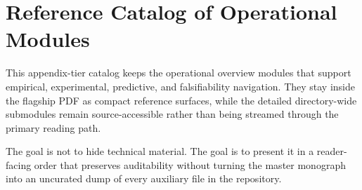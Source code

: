 \section{Reference Catalog of Operational Modules}
\label{sec:oc-core-1-3-reference-catalog}

This appendix-tier catalog keeps the operational overview modules that support
empirical, experimental, predictive, and falsifiability navigation. They stay
inside the flagship PDF as compact reference surfaces, while the detailed
directory-wide submodules remain source-accessible rather than being streamed
through the primary reading path.

The goal is not to hide technical material. The goal is to present it in a
reader-facing order that preserves auditability without turning the master
monograph into an uncurated dump of every auxiliary file in the repository.

\begingroup
\let\ocappendixsection\section
\let\ocappendixsubsection\subsection
\let\ocappendixsubsubsection\subsubsection
\renewcommand{\section}{\ocappendixsubsection}
\renewcommand{\subsection}{\ocappendixsubsubsection}

\endgroup
